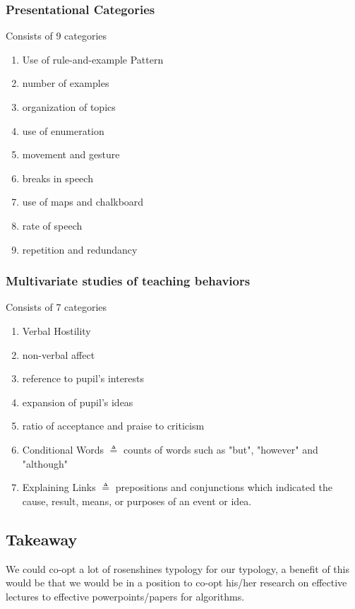 \documentclass[10pt, letterpaper]{article}
\begin{document}
\subsubsection*{Presentational Categories}
\label{sec:orgc55a2f4}
Consists of 9 categories
\begin{enumerate}
\item Use of rule-and-example Pattern
\item number of examples
\item organization of topics
\item use of enumeration
\item movement and gesture
\item breaks in speech
\item use of maps and chalkboard
\item rate of speech
\item repetition and redundancy
\end{enumerate}
\subsubsection*{Multivariate studies of teaching behaviors}
\label{sec:orga065f25}
Consists of 7 categories
\begin{enumerate}
\item Verbal Hostility
\item non-verbal affect
\item reference to pupil's interests
\item expansion of pupil's ideas
\item ratio of acceptance and praise to criticism
\item Conditional Words \(\triangleq\) counts of words such as "but", "however" and "although"
\item Explaining Links \(\triangleq\) prepositions and conjunctions which indicated the cause, result, means, or purposes of an event or idea.
\end{enumerate}

\subsection*{Takeaway}
\label{sec:orga738562}
We could co-opt a lot of rosenshines typology for our typology, a benefit of this would be that we would be in a position to co-opt his/her research on effective lectures to effective powerpoints/papers for algorithms.




\end{document}
